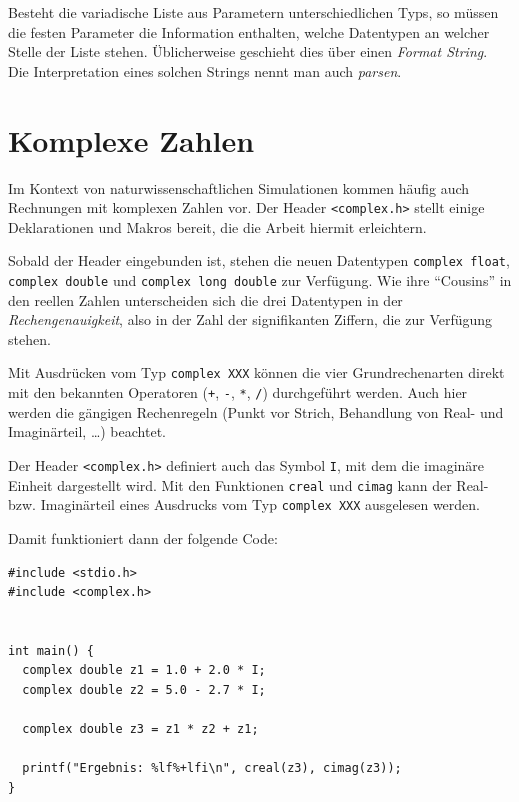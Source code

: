 Besteht die variadische Liste aus Parametern unterschiedlichen Typs, so müssen die festen Parameter die Information enthalten, welche Datentypen an welcher Stelle der Liste stehen. Üblicherweise geschieht dies über einen \emph{Format String}. Die Interpretation eines solchen Strings nennt man auch \emph{parsen}.

\section{Komplexe Zahlen} \label{sec:complexNums}
Im Kontext von naturwissenschaftlichen Simulationen kommen häufig auch Rechnungen mit komplexen Zahlen vor. Der Header \texttt{<complex.h>} stellt einige Deklarationen und Makros bereit, die die Arbeit hiermit erleichtern.

Sobald der Header eingebunden ist, stehen die neuen Datentypen \texttt{complex float}, \texttt{complex double} und \texttt{complex long double} zur Verfügung. Wie ihre \enquote{Cousins} in den reellen Zahlen unterscheiden sich die drei Datentypen in der \emph{Rechengenauigkeit}, also in der Zahl der signifikanten Ziffern, die zur Verfügung stehen.

Mit Ausdrücken vom Typ \texttt{complex XXX} können die vier Grundrechenarten direkt mit den bekannten Operatoren (\texttt{+}, \texttt{-}, \texttt{*}, \texttt{/}) durchgeführt werden. Auch hier werden die gängigen Rechenregeln (Punkt vor Strich, Behandlung von Real- und Imaginärteil, \ldots) beachtet.

Der Header \texttt{<complex.h>} definiert auch das Symbol \texttt{I}, mit dem die imaginäre Einheit dargestellt wird. Mit den Funktionen \texttt{creal} und \texttt{cimag} kann der Real- bzw. Imaginärteil eines Ausdrucks vom Typ \texttt{complex XXX} ausgelesen werden.

Damit funktioniert dann der folgende Code:

\begin{codebox}
\begin{verbatim}
#include <stdio.h>
#include <complex.h>

 
int main() {
  complex double z1 = 1.0 + 2.0 * I;
  complex double z2 = 5.0 - 2.7 * I;
  
  complex double z3 = z1 * z2 + z1;
  
  printf("Ergebnis: %lf%+lfi\n", creal(z3), cimag(z3));
}
\end{verbatim}
\end{codebox}

